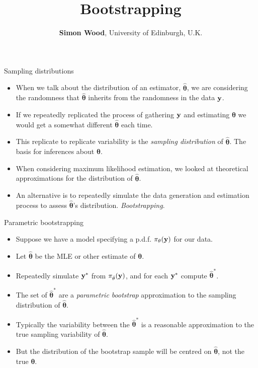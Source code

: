 \documentclass{beamer}
\title{Bootstrapping}
\author{{\bf Simon Wood}, University of Edinburgh, U.K.}
\date{}
\begin{document}
\begin{frame}
\titlepage
\end{frame}

\begin{frame}{Sampling distributions}
\begin{itemize}
\item When we talk about the distribution of an estimator, $\hat {\bm \theta}$, we are considering the randomness that $\hat {\bm \theta}$ inherits from the randomness in the data $\bf y$.
\item If we repeatedly replicated the process of gathering $\bf y$ and estimating $\bm \theta$ we would get a somewhat different $\hat {\bm \theta}$ each time. 
\item This replicate to replicate variability is the {\em sampling distribution} of $\hat {\bm \theta}$. The basis for inferences about $\bm \theta$. 
\item When considering maximum likelihood estimation, we looked at theoretical approximations for the distribution of $\hat {\bm \theta}$. 
\item An alternative is to repeatedly simulate the data generation and estimation process to assess  $\hat {\bm \theta}$'s distribution. {\em Bootstrapping}.
\end{itemize}
\end{frame}


\begin{frame}{Parametric bootstrapping}
\begin{itemize}
\item Suppose we have a model specifying a p.d.f. $\pi_{\theta}({\bf y})$ for our data. 
\item Let $\hat {\bm \theta}$ be the MLE or other estimate of $\bm \theta$.
\item Repeatedly simulate ${\bf y}^*$ from $\pi_{\hat \theta}({\bf y})$, and for each ${\bf y}^*$ compute $\hat {\bm \theta}^*$. 
\item The set of $\hat {\bm \theta}^*$ are a {\em parametric bootstrap} approximation to the sampling distribution of $\hat {\bm \theta}$. 
\item Typically the variability between the $\hat {\bm \theta}^*$ is a reasonable approximation to the true sampling variability of $\hat {\bm \theta}$.
\item But the distribution of the bootstrap sample will be centred on $\hat {\bm \theta}$, not the true $\bm \theta$. 
\end{itemize}
\end{frame}
\end{document}
